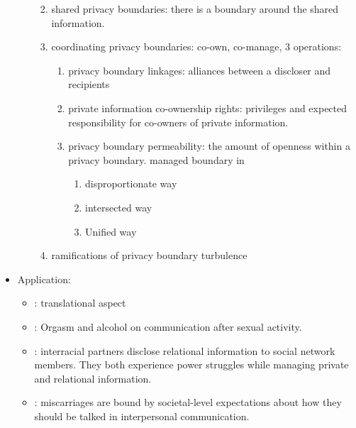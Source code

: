 \documentclass[
]{book}
\providecommand{\tightlist}{%
  \setlength{\itemsep}{0pt}\setlength{\parskip}{0pt}}
\begin{document}
\begin{itemize}
\begin{itemize}
    \begin{enumerate}
    \def\labelenumi{(\arabic{enumi})}
    \item
      shared privacy boundaries: there is a boundary around the shared information.
    \item
      coordinating privacy boundaries: co-own, co-manage, 3 operations:

      \begin{enumerate}
      \def\labelenumii{(\arabic{enumii})}
      \item
        privacy boundary linkages: alliances between a discloser and recipients
      \item
        private information co-ownership rights: privileges and expected responsibility for co-owners of private information.
      \item
        privacy boundary permeability: the amount of openness within a privacy boundary. managed boundary in

        \begin{enumerate}
        \def\labelenumiii{(\arabic{enumiii})}
        \tightlist
        \item
          disproportionate way
        \item
          intersected way
        \item
          Unified way
        \end{enumerate}
      \end{enumerate}
    \item
      ramifications of privacy boundary turbulence
    \end{enumerate}
  \end{itemize}
\item
  Application:

  \begin{itemize}
  \tightlist
  \item
    \citep{Petronio_2007}: translational aspect
  \item
    \citep{Bute_2017}: Orgasm and alcohol on communication after sexual activity.\\
  \item
    \citep{Brummett_2014}: interracial partners disclose relational information to social network members. They both experience power struggles while managing private and relational information.
  \item
    \citep{Denes_2014}: miscarriages are bound by societal-level expectations about how they should be talked in interpersonal communication.
  \end{itemize}
\end{itemize}
\end{document}
